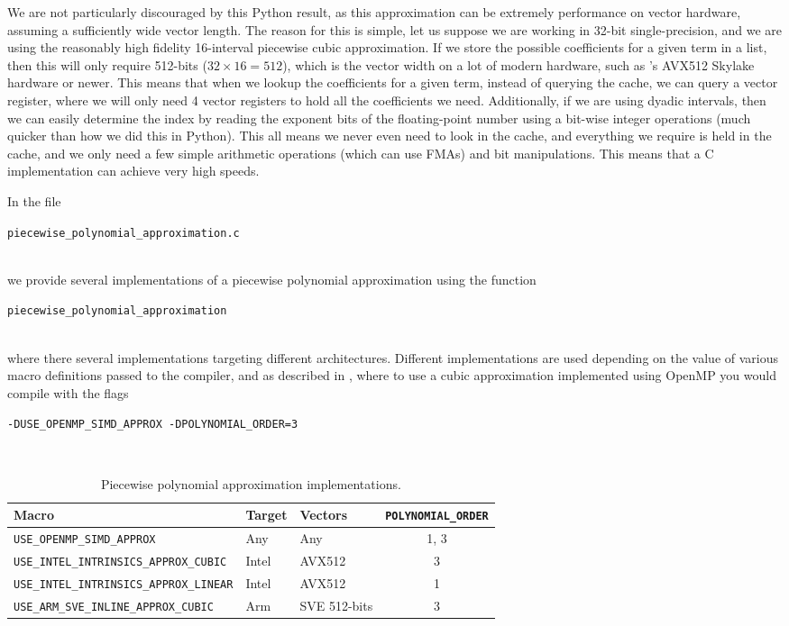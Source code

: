 \documentclass[11pt,a4paper,twoside,english]{extarticle}
\newcommand{\singlecodeline}[1]{\\[1em]\centerline{\lstinline[basicstyle=\ttfamily]$#1$}\\[1em]}
\begin{document}
We are not particularly discouraged by this Python result, as this approximation can be extremely performance on vector hardware, assuming a sufficiently wide vector length. The reason for this is simple, let us suppose we are working in 32-bit single-precision, and we are using the reasonably high fidelity 16-interval piecewise cubic approximation. If we store the possible coefficients for a given term in a list, then this will only require 512-bits ($ 32 \times 16 = 512 $), which is the vector width on a lot of modern hardware, such as \intel's AVX512 Skylake hardware or newer. This means that when we lookup the coefficients for a given term, instead of querying the cache, we can query a vector register, where we will only need 4 vector registers to hold all the coefficients we need. Additionally, if we are using dyadic intervals, then we can easily determine the index by reading the exponent bits of the floating-point number using a bit-wise integer operations (much quicker than how we did this in Python). This all means we never even need to look in the cache, and everything we require is held in the cache, and we only need a few simple arithmetic operations (which can use FMAs) and bit manipulations. This means that a C implementation can achieve very high speeds.

In the file \singlecodeline{piecewise_polynomial_approximation.c} we provide several implementations of a piecewise polynomial approximation using the function \singlecodeline{piecewise_polynomial_approximation}
where there several implementations targeting different architectures. Different implementations are used depending on the value of various macro definitions passed to the compiler, and as described in , where to use a cubic approximation implemented using OpenMP you would compile with the flags
\singlecodeline{-DUSE_OPENMP_SIMD_APPROX -DPOLYNOMIAL_ORDER=3}

\begin{table}[htb]
\centering
\begin{tabular}{lllc}
Macro & Target & Vectors &  \verb|POLYNOMIAL_ORDER| \\
\hline
\verb|USE_OPENMP_SIMD_APPROX|  & Any & Any & 1, 3\\
\verb|USE_INTEL_INTRINSICS_APPROX_CUBIC| & Intel & AVX512& 3\\
\verb|USE_INTEL_INTRINSICS_APPROX_LINEAR| &Intel &  AVX512 & 1\\
\verb|USE_ARM_SVE_INLINE_APPROX_CUBIC| & Arm & SVE 512-bits & 3 \\
\end{tabular}
\caption{Piecewise polynomial approximation implementations.}
\label{tab:piecewise_polynomial_approximation_implementations}
\end{table} 
\end{document}

